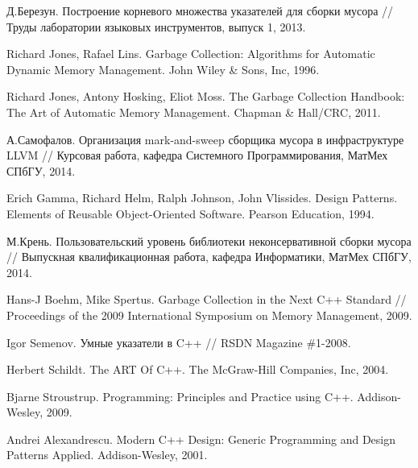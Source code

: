 
% 
% 

\begin{thebibliography}{9001}

 Д.Березун. Построение корневого множества указателей для сборки мусора
// Труды лаборатории языковых инструментов, выпуск 1, 2013.

 Richard Jones, Rafael Lins. Garbage Collection: Algorithms for Automatic Dynamic Memory Management.
John Wiley \& Sons, Inc, 1996.

 Richard Jones, Antony Hosking, Eliot Moss. The Garbage Collection Handbook: The Art of Automatic Memory Management. Chapman \& Hall/CRC, 2011.

 А.Самофалов. Организация mark-and-sweep сборщика мусора в инфраструктуре LLVM //
Курсовая работа, кафедра Системного Программирования, МатМех СПбГУ, 2014.

 Erich Gamma, Richard Helm, Ralph Johnson, John Vlissides. Design Patterns. Elements of Reusable Object-Oriented Software. Pearson Education, 1994.

 М.Крень. Пользовательский уровень библиотеки неконсервативной сборки мусора //
Выпускная квалификационная работа, кафедра Информатики, МатМех СПбГУ, 2014.

 Hans-J Boehm, Mike Spertus. Garbage Collection in the Next C++ Standard //
Proceedings of the 2009 International Symposium on Memory Management, 2009.

 Igor Semenov. Умные указатели в C++ // RSDN Magazine \#1-2008.

 Herbert Schildt. The ART Of C++. The McGraw-Hill Companies, Inc, 2004.

 Bjarne Stroustrup. Programming: Principles and Practice using C++. Addison-Wesley, 2009.

 Andrei Alexandrescu. Modern C++ Design: Generic Programming and Design Patterns Applied. Addison-Wesley, 2001.

\end{thebibliography}
